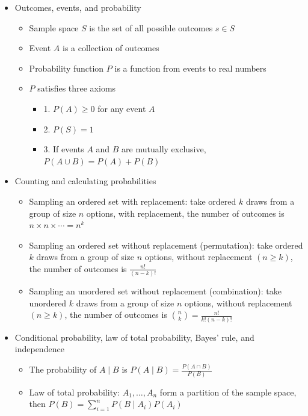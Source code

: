 \documentclass{article}
\begin{document}
\begin{itemize}
\subsection{Slide 5 (Midterm Review)}
    \item Outcomes, events, and probability
    \begin{itemize}
        \item Sample space $S$ is the set of all possible outcomes $s \in S$
        \item Event $A$ is a collection of outcomes
        \item Probability function $P$ is a function from events to real numbers
        \item $P$ satisfies three axioms
        \begin{itemize}
            \item 1. $P(A) \ge 0$ for any event $A$
            \item 2. $P(S) = 1$
            \item 3. If events $A$ and $B$ are mutually exclusive, $P(A \cup B) = P(A) + P(B)$
        \end{itemize}
    \end{itemize}
    \item Counting and calculating probabilities
    \begin{itemize}
        \item Sampling an ordered set with replacement: take ordered $k$ draws from a group of size $n$ options, with replacement, the number of outcomes is $n \times n \times \cdots = n^k$
        \item Sampling an ordered set without replacement (permutation): take ordered $k$ draws from a group of size $n$ options, without replacement $(n \ge k)$, the number of outcomes is $\frac{n!}{(n-k)!}$
        \item Sampling an unordered set without replacement (combination): take unordered $k$ draws from a group of size $n$ options, without replacement $(n \ge k)$, the number of outcomes is $\binom{n}{k} = \frac{n!}{k!(n-k)!}$
    \end{itemize}
    \item Conditional probability, law of total probability, Bayes' rule, and independence
    \begin{itemize}
        \item The probability of $A \mid B$ is $P(A \mid B) = \frac{P(A \cap B)}{P(B)}$
        \item Law of total probability: $A_1,\dots,A_n$ form a partition of the sample space, then $P(B) = \sum_{i=1}^n P(B \mid A_i)P(A_i)$

\end{itemize}
\end{itemize}
\end{document}
